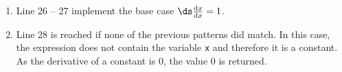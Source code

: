 \begin{enumerate}
      language provides:
      \\[0.2cm]
      \hspace*{1.3cm}
      $\ds\frac{\mathrm{d}\;}{\mathrm{d}x}\ln\bigl(f(x)\bigr) 
       = \frac{\frac{\mathrm{d}}{\mathrm{d}x} f(x)}{f(x)}$
      \qquad and \qquad
      $\ds\frac{\mathrm{d}\;}{\mathrm{d}x}\exp\bigl(f(x)\bigr)
       = \Bigl(\frac{\mathrm{d}\;}{\mathrm{d}x} f(x)\Bigr) \cdot \exp\bigl(f(x)\bigr)$.
      \\[0.2cm]
      Observe that line 25 reuses the expression \texttt{e} instead of building the tree
      \texttt{('exp', f)} a second time.
\item Line 26 -- 27 implement the base case
      $\ds\frac{\mathrm{d}x}{\mathrm{d}x} = 1$.
\item Line 28 is reached if none of the previous patterns did match.  In this case, the expression does
      not contain the variable \texttt{x} and therefore it is a constant.  As the derivative of a constant
      is $0$, the value $0$ is returned.
\end{enumerate}
\FloatBarrier

